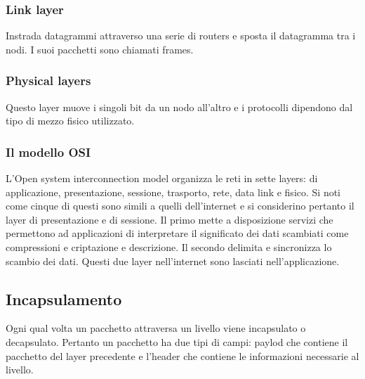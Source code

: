 \subsubsection{Link layer}
Instrada datagrammi attraverso una serie di routers e sposta il datagramma tra i nodi. I suoi pacchetti sono chiamati frames.
\subsubsection{Physical layers}
Questo layer muove i singoli bit da un nodo all'altro e i protocolli dipendono dal tipo di mezzo fisico utilizzato.
\subsubsection{Il modello OSI}
L'Open system interconnection model organizza le reti in sette layers: di applicazione, presentazione, sessione, trasporto, rete, data link e fisico. Si noti come cinque di questi sono simili a quelli dell'internet
e si considerino pertanto il layer di presentazione e di sessione. Il primo mette a disposizione servizi che permettono ad applicazioni di interpretare il significato dei dati scambiati come compressioni e 
criptazione e descrizione. Il secondo delimita e sincronizza lo scambio dei dati. Questi due layer nell'internet sono lasciati nell'applicazione. 
\subsection{Incapsulamento}
Ogni qual volta un pacchetto attraversa un livello viene incapsulato o decapsulato. Pertanto un pacchetto ha due tipi di campi: paylod che contiene il pacchetto del layer precedente e l'header che contiene le 
informazioni necessarie al livello. 